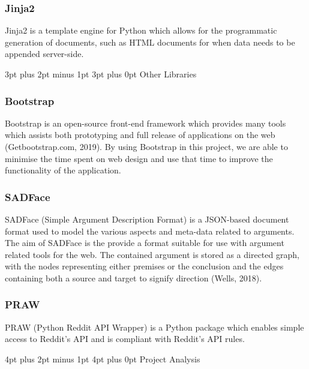 \documentclass[12pt,a4paper]{article}
\makeatletter
\renewcommand\subsection{\@startsection {subsection}{1}{2mm} %
                               {3pt plus 2pt minus 1pt} %
                               {3pt plus 0pt} %
                               {\normalfont\bfseries}}
\renewcommand\section{\@startsection {section}{1}{0mm} %
                               {4pt plus 2pt minus 1pt} %
                               {4pt plus 0pt} %
                               {\bfseries}}
\makeatother
\begin{document}
\subsubsection{Jinja2}

Jinja2 is a template engine for Python which allows for the programmatic generation of documents, such as HTML documents for when data needs to be appended server-side.

\subsection{Other Libraries}

\subsubsection{Bootstrap}

Bootstrap is an open-source front-end framework which provides many tools which assists both prototyping and full release of applications on the web (Getbootstrap.com, 2019). By using Bootstrap in this project, we are able to minimise the time spent on web design and use that time to improve the functionality of the application.

\subsubsection{SADFace}

SADFace (Simple Argument Description Format) is a JSON-based document format used to model the various aspects and meta-data related to arguments. The aim of SADFace is the provide a format suitable for use with argument related tools for the web. The contained argument is stored as a directed graph, with the nodes representing either premises or the conclusion and the edges containing both a source and target to signify direction (Wells, 2018).

\subsubsection{PRAW}

PRAW (Python Reddit API Wrapper) is a Python package which enables simple access to Reddit's API and is compliant with Reddit's API rules.


\newpage
\section{Project Analysis}
\end{document}
